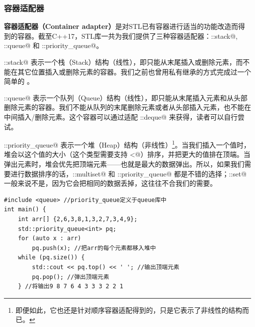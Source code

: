 \subsubsection*{容器适配器}
\textbf{容器适配器（Container adapter）}是对STL已有容器进行适当的功能改造而得到的容器。截至C++17，STL库一共为我们提供了三种容器适配器：\lstinline@std::stack@, \lstinline@std::queue@ 和 \lstinline@std::priority_queue@。\par
\lstinline@std::stack@ 表示一个栈（Stack）结构（线性），即只能从末尾插入或删除元素，而不能在其它位置插入或删除元素的容器。我们之前也曾用私有继承的方式完成过一个简单的 \lstinline@stack@。\par
\lstinline@std::queue@ 表示一个队列（Queue）结构（线性），即只能从末尾插入元素和从头部删除元素的容器。我们不能从队列的末尾删除元素或者从头部插入元素，也不能在中间插入/删除元素。这个容器可以通过适配 \lstinline@std::deque@ 来获得，读者可以自行尝试。\par
\lstinline@std::priority_queue@ 表示一个堆（Heap）结构（非线性）\footnote{即便如此，它也还是针对顺序容器适配得到的，只是它表示了非线性的结构而已。}。当我们插入一个值时，堆会以这个值的大小（这个类型需要支持 \lstinline@<@）排序，并把更大的值排在顶端。当弹出元素时，堆会优先把顶端元素——也就是最大的数据弹出。所以，如果我们需要进行数据排序的话，\lstinline@std::multiset@ 和 \lstinline@std::priority_queue@ 都是不错的选择；\lstinline@std::set@ 一般来说不是，因为它会把相同的数据丢掉，这往往不合我们的需要。
\begin{lstlisting}
#include <queue> //priority_queue定义于queue库中
int main() {
    int arr[] {2,6,3,8,1,3,2,7,3,4,9};
    std::priority_queue<int> pq;
    for (auto x : arr)
        pq.push(x); //把arr的每个元素都移入堆中
    while (pq.size()) {
        std::cout << pq.top() << ' '; //输出顶端元素
        pq.pop(); //弹出顶端元素
    } //将输出9 8 7 6 4 3 3 3 2 2 1
\end{lstlisting}\par
